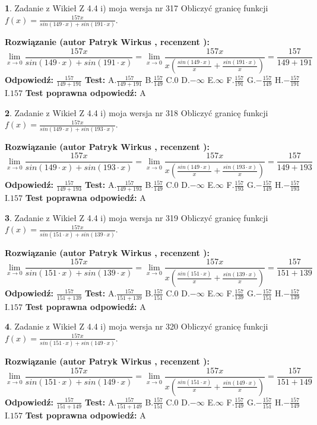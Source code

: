 \documentclass[12pt, a4paper]{article}
\theoremstyle{definition} %
\newtheorem{zad}{}
\newcommand{\zadStart}[1]{\begin{zad}#1\newline}
\newcommand{\zadStop}{\end{zad}}
\newcommand{\rozwStart}[2]{\noindent \textbf{Rozwiązanie (autor #1 , recenzent #2): }\newline}
\newcommand{\rozwStop}{\newline}
\newcommand{\odpStart}{\noindent \textbf{Odpowiedź:}\newline}
\newcommand{\odpStop}{\newline}
\newcommand{\testStart}{\noindent \textbf{Test:}\newline}
\newcommand{\testStop}{\newline}
\newcommand{\kluczStart}{\noindent \textbf{Test poprawna odpowiedź:}\newline}
\newcommand{\kluczStop}{\newline}
\begin{document}
\zadStart{Zadanie z Wikieł Z 4.4 i) moja wersja nr 317}
Obliczyć granicę funkcji $f(x)=\frac{157x}{sin(149\cdot x) +sin(191\cdot x)}$.
\zadStop
\rozwStart{Patryk Wirkus}{}
$$\lim\limits_{x\to 0}\frac{157x}{sin(149\cdot x) +sin(191\cdot x)}=\lim\limits_{x\to 0}\frac{157x}{x(\frac{sin(149\cdot x)}{x}+\frac{sin(191\cdot x)}{x})}=\frac{157}{149+191}$$
\rozwStop
\odpStart
$\frac{157}{149+191}$
\odpStop
\testStart
A.$\frac{157}{149+191}$
B.$\frac{157}{149}$
C.$0$
D.$-\infty$
E.$\infty$
F.$\frac{157}{191}$
G.$-\frac{157}{149}$
H.$-\frac{157}{191}$
I.$157$
\testStop
\kluczStart
A
\kluczStop



\zadStart{Zadanie z Wikieł Z 4.4 i) moja wersja nr 318}
Obliczyć granicę funkcji $f(x)=\frac{157x}{sin(149\cdot x) +sin(193\cdot x)}$.
\zadStop
\rozwStart{Patryk Wirkus}{}
$$\lim\limits_{x\to 0}\frac{157x}{sin(149\cdot x) +sin(193\cdot x)}=\lim\limits_{x\to 0}\frac{157x}{x(\frac{sin(149\cdot x)}{x}+\frac{sin(193\cdot x)}{x})}=\frac{157}{149+193}$$
\rozwStop
\odpStart
$\frac{157}{149+193}$
\odpStop
\testStart
A.$\frac{157}{149+193}$
B.$\frac{157}{149}$
C.$0$
D.$-\infty$
E.$\infty$
F.$\frac{157}{193}$
G.$-\frac{157}{149}$
H.$-\frac{157}{193}$
I.$157$
\testStop
\kluczStart
A
\kluczStop



\zadStart{Zadanie z Wikieł Z 4.4 i) moja wersja nr 319}
Obliczyć granicę funkcji $f(x)=\frac{157x}{sin(151\cdot x) +sin(139\cdot x)}$.
\zadStop
\rozwStart{Patryk Wirkus}{}
$$\lim\limits_{x\to 0}\frac{157x}{sin(151\cdot x) +sin(139\cdot x)}=\lim\limits_{x\to 0}\frac{157x}{x(\frac{sin(151\cdot x)}{x}+\frac{sin(139\cdot x)}{x})}=\frac{157}{151+139}$$
\rozwStop
\odpStart
$\frac{157}{151+139}$
\odpStop
\testStart
A.$\frac{157}{151+139}$
B.$\frac{157}{151}$
C.$0$
D.$-\infty$
E.$\infty$
F.$\frac{157}{139}$
G.$-\frac{157}{151}$
H.$-\frac{157}{139}$
I.$157$
\testStop
\kluczStart
A
\kluczStop



\zadStart{Zadanie z Wikieł Z 4.4 i) moja wersja nr 320}
Obliczyć granicę funkcji $f(x)=\frac{157x}{sin(151\cdot x) +sin(149\cdot x)}$.
\zadStop
\rozwStart{Patryk Wirkus}{}
$$\lim\limits_{x\to 0}\frac{157x}{sin(151\cdot x) +sin(149\cdot x)}=\lim\limits_{x\to 0}\frac{157x}{x(\frac{sin(151\cdot x)}{x}+\frac{sin(149\cdot x)}{x})}=\frac{157}{151+149}$$
\rozwStop
\odpStart
$\frac{157}{151+149}$
\odpStop
\testStart
A.$\frac{157}{151+149}$
B.$\frac{157}{151}$
C.$0$
D.$-\infty$
E.$\infty$
F.$\frac{157}{149}$
G.$-\frac{157}{151}$
H.$-\frac{157}{149}$
I.$157$
\testStop
\kluczStart
A
\kluczStop
\end{document}
